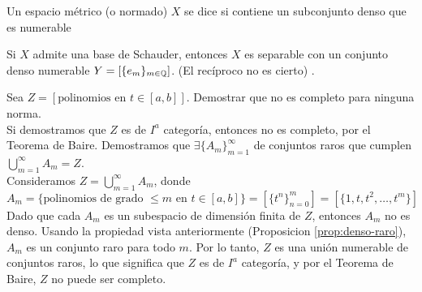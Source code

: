 \begin{definicion}
    Un espacio métrico (o normado) $X$ se dice  si contiene un subconjunto denso que es numerable
\end{definicion}

\begin{observacion}
    Si $X$ admite una base de Schauder, entonces $X$ es separable con un conjunto denso numerable $Y = [\{e_m\}_{m\in\mathbb{Q}}]$.
    (El recíproco no es cierto) .
\end{observacion}

\begin{ejercicio}
    Sea $Z = [\text{polinomios en } t \in [a, b]]$. Demostrar que no es completo para ninguna norma.\\

    \noindent
    Si demostramos que $Z$ es de $I^a$ categoría, entonces no es completo, por el Teorema de Baire. Demostramos que $\exists \{A_m\}_{m=1}^\infty$ de conjuntos raros que cumplen $\bigcup_{m=1}^\infty A_m = Z$. \\
    \noindent
    Consideramos \mbox{$Z = \bigcup_{m=1}^\infty A_m$}, donde
    \begin{equation*}
        A_m = \{\text{polinomios de grado } \leq m \text{ en } t \in [a, b]\} = [\{t^n\}_{n=0}^m]= [\{1, t, t^2, \dots, t^m\}]
    \end{equation*}
    Dado que cada $A_m$ es un subespacio de dimensión finita de $Z$, entonces $A_m$ no es denso. Usando la propiedad vista anteriormente (Proposicion \ref{prop:denso-raro}), $A_m$ es un conjunto raro para todo $m$. Por lo tanto, $Z$ es una unión numerable de conjuntos raros, lo que significa que $Z$ es de $I^a$ categoría, y por el Teorema de Baire, $Z$ no puede ser completo.
\end{ejercicio}


